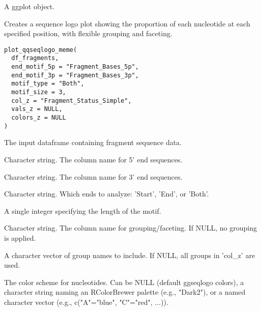 \documentclass[a4paper]{book}
\begin{document}
%
\begin{Value}
A ggplot object.
\end{Value}
%
\begin{Description}
Creates a sequence logo plot showing the proportion of each nucleotide at each specified position, with flexible
grouping and faceting.
\end{Description}
%
\begin{Usage}
\begin{verbatim}
plot_qqseqlogo_meme(
  df_fragments,
  end_motif_5p = "Fragment_Bases_5p",
  end_motif_3p = "Fragment_Bases_3p",
  motif_type = "Both",
  motif_size = 3,
  col_z = "Fragment_Status_Simple",
  vals_z = NULL,
  colors_z = NULL
)
\end{verbatim}
\end{Usage}
%
\begin{Arguments}
\begin{ldescription}
\item[\code{df\_fragments}] The input dataframe containing fragment sequence data.

\item[\code{end\_motif\_5p}] Character string. The column name for 5' end sequences.

\item[\code{end\_motif\_3p}] Character string. The column name for 3' end sequences.

\item[\code{motif\_type}] Character string. Which ends to analyze: 'Start', 'End', or 'Both'.

\item[\code{motif\_size}] A single integer specifying the length of the motif.

\item[\code{col\_z}] Character string. The column name for grouping/faceting. If NULL, no grouping is applied.

\item[\code{vals\_z}] A character vector of group names to include. If NULL, all groups in 'col\_z' are used.

\item[\code{colors\_z}] The color scheme for nucleotides. Can be NULL (default ggseqlogo colors), a character string naming
an RColorBrewer palette (e.g., "Dark2"), or a named character vector (e.g., c("A"="blue", "C"="red", ...)).
\end{ldescription}
\end{Arguments}
\end{document}
